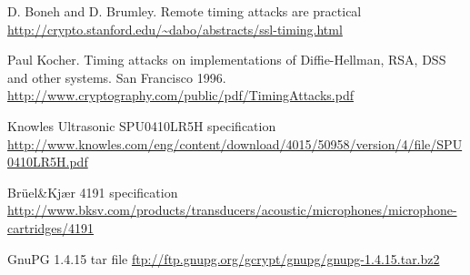 \begin{thebibliography}{11}

 D. Boneh and D. Brumley. Remote timing attacks are practical
\url{http://crypto.stanford.edu/~dabo/abstracts/ssl-timing.html}

 Paul Kocher. Timing attacks on implementations of Diffie-Hellman, RSA, DSS and other systems. San Francisco 1996.
\url{http://www.cryptography.com/public/pdf/TimingAttacks.pdf}


 Knowles Ultrasonic SPU0410LR5H specification
\url{http://www.knowles.com/eng/content/download/4015/50958/version/4/file/SPU0410LR5H.pdf}


 Brüel\&Kjær 4191 specification
\url{http://www.bksv.com/products/transducers/acoustic/microphones/microphone-cartridges/4191}


 GnuPG 1.4.15 tar file
\url{ftp://ftp.gnupg.org/gcrypt/gnupg/gnupg-1.4.15.tar.bz2}
\end{thebibliography}